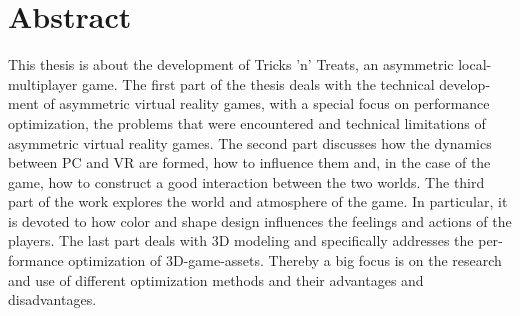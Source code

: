 \chapter{Abstract}

\begin{english} 
This thesis is about the development of Tricks 'n' Treats, an asymmetric local-multiplayer game.
The first part of the thesis deals with the technical development of asymmetric virtual reality games, with a special focus on performance optimization, the problems that were encountered and technical limitations of asymmetric virtual reality games.
The second part discusses how the dynamics between PC and VR are formed, how to influence them and, in the case of the game, how to construct a good interaction between the two worlds. 
The third part of the work explores the world and atmosphere of the game. In particular, it is devoted to how color and shape design influences the feelings and actions of the players. 
The last part deals with 3D modeling and specifically addresses the performance optimization of 3D-game-assets. Thereby a big focus is on the research and use of different optimization methods and their advantages and disadvantages.
\end{english}
